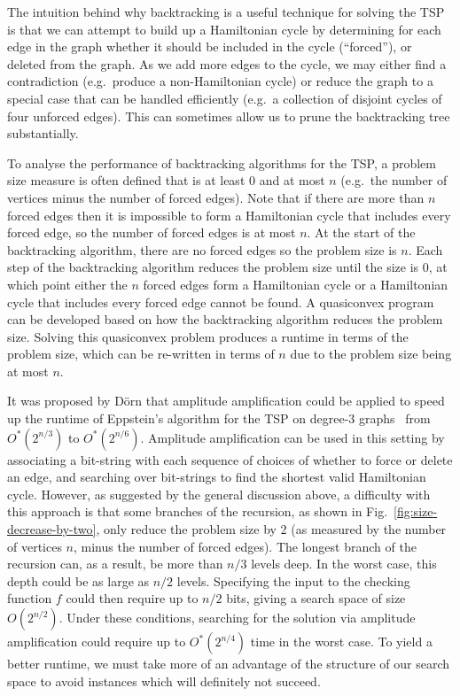 The intuition behind why backtracking is a useful technique for solving the TSP is that we can attempt to build up a Hamiltonian cycle by determining for each edge in the graph whether it should be included in the cycle (``forced''), or deleted from the graph. As we add more edges to the cycle, we may either find a contradiction (e.g.\ produce a non-Hamiltonian cycle) or reduce the graph to a special case that can be handled efficiently (e.g.\ a collection of disjoint cycles of four unforced edges). This can sometimes allow us to prune the backtracking tree substantially.

To analyse the performance of backtracking algorithms for the TSP, a problem size measure is often defined that is at least 0 and at most $n$ (e.g.\ the number of vertices minus the number of forced edges). Note that if there are more than $n$ forced edges then it is impossible to form a Hamiltonian cycle that includes every forced edge, so the number of forced edges is at most $n$. At the start of the backtracking algorithm, there are no forced edges so the problem size is $n$. Each step of the backtracking algorithm reduces the problem size until the size is $0$, at which point either the $n$ forced edges form a Hamiltonian cycle or a Hamiltonian cycle that includes every forced edge cannot be found. A quasiconvex program can be developed based on how the backtracking algorithm reduces the problem size. Solving this quasiconvex problem produces a runtime in terms of the problem size, which can be re-written in terms of $n$ due to the problem size being at most $n$.

It was proposed by D\"orn \cite{dorn2007} that amplitude amplification could be applied to speed up the runtime of Eppstein's algorithm for the TSP on degree-3 graphs~\cite{eppstein2007} from $O^*(2^{n/3})$ to $O^*(2^{n/6})$. Amplitude amplification can be used in this setting by associating a bit-string with each sequence of choices of whether to force or delete an edge, and searching over bit-strings to find the shortest valid Hamiltonian cycle. However, as suggested by the general discussion above, a difficulty with this approach is that some branches of the recursion, as shown in Fig.~\ref{fig:size-decrease-by-two}, only reduce the problem size by 2 (as measured by the number of vertices $n$, minus the number of forced edges). The longest branch of the recursion can, as a result, be more than $n/3$ levels deep. In the worst case, this depth could be as large as $n/2$ levels. Specifying the input to the checking function $f$ could then require up to $n/2$ bits, giving a search space of size $O(2^{n/2})$. Under these conditions, searching for the solution via amplitude amplification could require up to $O^*(2^{n/4})$ time in the worst case. To yield a better runtime, we must take more of an advantage of the structure of our search space to avoid instances which will definitely not succeed.


